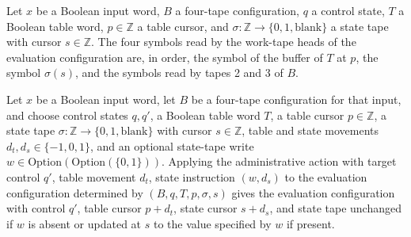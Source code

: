 \begin{lemma}
\label{Turing.timedCut_Eval_reads}
\leanok
{}
Let $x$ be a Boolean input word, $B$ a four-tape configuration, $q$ a control state, $T$
a Boolean table word, $p\in\mathbb Z$ a table cursor, and $\sigma\colon\mathbb
Z\to\{0,1,\mathrm{blank}\}$ a state tape with cursor $s\in\mathbb Z$. The four symbols
read by the work-tape heads of the evaluation configuration are, in order, the symbol of
the buffer of $T$ at $p$, the symbol $\sigma(s)$, and the symbols read by tapes 2 and 3
of $B$.
\end{lemma}

\begin{lemma}
\label{Turing.timedCut_Admin_apply}
\leanok
{}
Let $x$ be a Boolean input word, let $B$ be a four-tape configuration for that input,
and choose control states $q,q'$, a Boolean table word $T$, a table cursor $p\in\mathbb
Z$, a state tape $\sigma\colon\mathbb Z\to\{0,1,\mathrm{blank}\}$ with cursor
$s\in\mathbb Z$, table and state movements $d_t,d_s\in\{-1,0,1\}$, and an optional
state-tape write $w\in\mathrm{Option}(\mathrm{Option}(\{0,1\}))$. Applying the
administrative action with target control $q'$, table movement $d_t$, state instruction
$(w,d_s)$ to the evaluation configuration determined by $(B,q,T,p,\sigma,s)$ gives the
evaluation configuration with control $q'$, table cursor $p+d_t$, state cursor $s+d_s$,
and state tape unchanged if $w$ is absent or updated at $s$ to the value specified by
$w$ if present.
\end{lemma}

